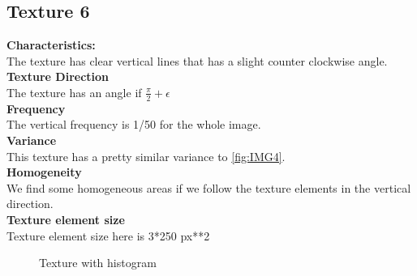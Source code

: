 \documentclass{article}
\begin{document}
\newpage
\subsection{Texture 6}
\textbf{Characteristics:}\\
The texture has clear vertical lines that has a slight counter clockwise angle. 
\\

\textbf{Texture Direction}\\
The texture has an angle if $\frac{\pi}{2}+\epsilon$  
\\ 
 
\textbf{Frequency} \\
The vertical frequency is 1/50 for the whole image.
\\

\textbf{Variance}\\
This texture has a pretty similar variance to \ref{fig:IMG4}.
\\

\textbf{Homogeneity}\\
We find some homogeneous areas if we follow the texture elements in the vertical direction.
\\

\textbf{Texture element size}\\
Texture element size here is 3*250 px**2
\\

\begin{figure}[h]%
	\centering
    \qquad
    \caption{Texture with histogram}%
    \label{fig:IMG6}%
\end{figure}
\end{document}
